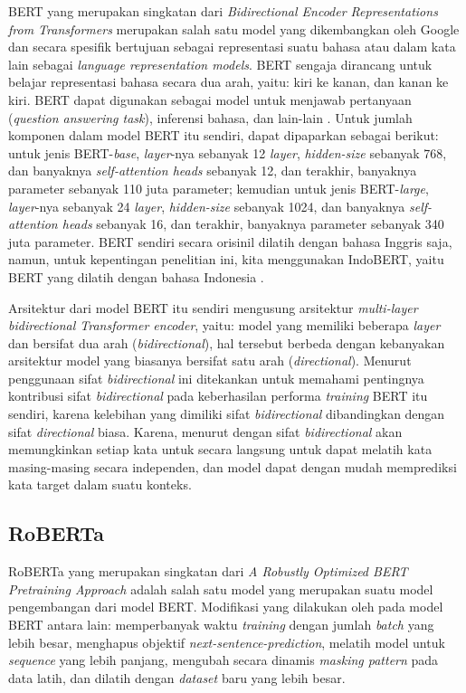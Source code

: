 BERT yang merupakan singkatan dari \emph{Bidirectional Encoder Representations from Transformers} merupakan salah satu model yang dikembangkan oleh Google dan secara spesifik bertujuan sebagai representasi suatu bahasa atau dalam kata lain sebagai \emph{language representation models}. BERT sengaja dirancang untuk belajar representasi bahasa secara dua arah, yaitu: kiri ke kanan, dan kanan ke kiri. BERT dapat digunakan sebagai model untuk menjawab pertanyaan (\emph{question answering task}), inferensi bahasa, dan lain-lain \citep{devlin-etal-2019-bert}. Untuk jumlah komponen dalam model BERT itu sendiri, dapat dipaparkan sebagai berikut: untuk jenis BERT-\emph{base}, \emph{layer}-nya sebanyak 12 \emph{layer}, \emph{hidden-size} sebanyak 768, dan banyaknya \emph{self-attention heads} sebanyak 12, dan terakhir, banyaknya parameter sebanyak 110 juta parameter; kemudian untuk jenis BERT-\emph{large}, \emph{layer}-nya sebanyak 24 \emph{layer}, \emph{hidden-size} sebanyak 1024, dan banyaknya \emph{self-attention heads} sebanyak 16, dan terakhir, banyaknya parameter sebanyak 340 juta parameter. BERT sendiri secara orisinil dilatih dengan bahasa Inggris saja, namun, untuk kepentingan penelitian ini, kita menggunakan IndoBERT, yaitu BERT yang dilatih dengan bahasa Indonesia \citep{koto2020indolem}.

Arsitektur dari model BERT itu sendiri mengusung arsitektur \emph{multi-layer bidirectional Transformer encoder}, yaitu: model yang memiliki beberapa \emph{layer} dan bersifat dua arah (\emph{bidirectional}), hal tersebut berbeda dengan kebanyakan arsitektur model yang biasanya bersifat satu arah (\emph{directional}). Menurut 
\citet{devlin-etal-2019-bert} penggunaan sifat \emph{bidirectional} ini ditekankan untuk memahami pentingnya kontribusi sifat \emph{bidirectional} pada keberhasilan performa \emph{training} BERT itu sendiri, karena kelebihan yang dimiliki sifat \emph{bidirectional} dibandingkan dengan sifat \emph{directional} biasa. Karena, menurut \citet{devlin-etal-2019-bert} dengan sifat \emph{bidirectional} akan memungkinkan setiap kata untuk secara langsung untuk dapat melatih kata masing-masing secara independen, dan model dapat dengan mudah memprediksi kata target dalam suatu konteks.

\subsection{RoBERTa}
RoBERTa yang merupakan singkatan dari \emph{A Robustly Optimized BERT Pretraining Approach} adalah salah satu model yang merupakan suatu model pengembangan dari model BERT. Modifikasi yang dilakukan oleh \citet{liu2019roberta} pada model BERT antara lain: memperbanyak waktu \emph{training} dengan jumlah \emph{batch} yang lebih besar, menghapus objektif \emph{next-sentence-prediction}, melatih model untuk \emph{sequence} yang lebih panjang, mengubah secara dinamis \emph{masking pattern} pada data latih, dan dilatih dengan \emph{dataset} baru yang lebih besar. 

